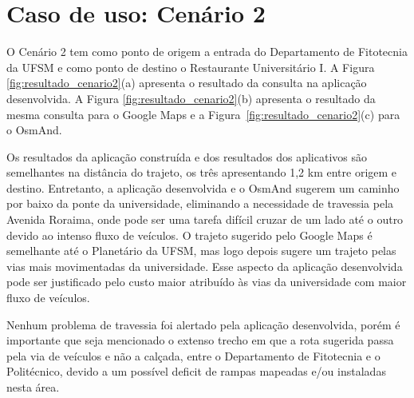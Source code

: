 \documentclass[oneside,openright,12pt]{ufsm_2015} %
\begin{document}
\section{Caso de uso: Cenário 2} 
O Cenário 2 tem como ponto de origem a entrada do Departamento de Fitotecnia da UFSM e como ponto de destino o Restaurante Universitário I.
A Figura \ref{fig:resultado_cenario2}(a) apresenta o resultado da consulta na aplicação desenvolvida.
A Figura \ref{fig:resultado_cenario2}(b) apresenta o resultado da mesma consulta para o Google Maps e a Figura~\ref{fig:resultado_cenario2}(c) para o OsmAnd.

Os resultados da aplicação construída e dos resultados dos aplicativos são semelhantes na distância do trajeto, os três apresentando 1,2 km entre origem e destino. 
Entretanto, a aplicação desenvolvida e o OsmAnd sugerem um caminho por baixo da ponte da universidade, eliminando a necessidade de travessia pela Avenida Roraima, onde pode ser uma tarefa difícil cruzar de um lado até o outro devido ao intenso fluxo de veículos. 
O trajeto sugerido pelo Google Maps é semelhante até o Planetário da UFSM, mas logo depois sugere um trajeto pelas vias mais movimentadas da universidade. Esse aspecto da aplicação desenvolvida pode ser justificado pelo custo maior atribuído às vias da universidade com maior fluxo de veículos.

Nenhum problema de travessia foi alertado pela aplicação desenvolvida, porém é importante que seja mencionado o extenso trecho em que a rota sugerida passa pela via de veículos e não a calçada, entre o Departamento de Fitotecnia e o Politécnico, devido a um possível deficit de rampas mapeadas e/ou instaladas nesta área.
\end{document}
